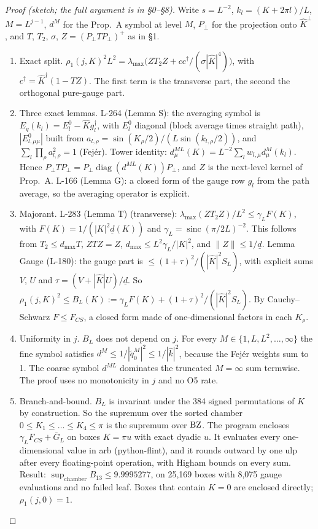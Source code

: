 \begin{proof}[Proof (sketch; the full argument is in  \S0--\S8)]
Write $s=L^{-2}$, $k_l=(K+2\pi l)/L$, $M=L^{j-1}$, $d^M$ for the Prop.\ A symbol at level $M$, $P_\perp$ for the projection onto $\hat K^\perp$, and $T$, $T_2$, $\sigma$, $Z=(P_\perp TP_\perp)^+$ as in  \S1.
\begin{enumerate}
\item Exact split. $\rho_1(j,K)^2L^2=\lambda_{\max}\bigl(ZT_2Z+cc^\dagger/(\sigma|\hat K|^4)\bigr)$, with $c^\dagger=\hat K^\dagger(1-TZ)$. The first term is the transverse part, the second the orthogonal pure-gauge part.
\item Three exact lemmas. L-264 (Lemma S): the averaging symbol is $E_q(k_l)=E^0_l-\hat Kg_l^\dagger$, with $E^0_l$ diagonal (block average times straight path), $|E^0_{l,\mu\mu}|$ built from $a_{l,\rho}=\sin(K_\rho/2)/(L\sin(k_{l,\rho}/2))$, and $\sum_l\prod_\rho a_{l,\rho}^2=1$ (Fej\'er). Tower identity: $d^{ML}_\mu(K)=L^{-2}\sum_lw_{l,\mu}d^M_\mu(k_l)$. Hence $P_\perp TP_\perp=P_\perp\operatorname{diag}(d^{ML}(K))P_\perp$, and $Z$ is the next-level kernel of Prop.\ A. L-166 (Lemma G): a closed form of the gauge row $g_l$ from the path average, so the averaging operator is explicit.
\item Majorant. L-283 (Lemma T) (transverse): $\lambda_{\max}(ZT_2Z)/L^2\le\gamma_LF(K)$, with $F(K)=1/(|K|^2\underline d(K))$ and $\gamma_L=\operatorname{sinc}(\pi/2L)^{-2}$. This follows from $T_2\le d_{\max}T$, $ZTZ=Z$, $d_{\max}\le L^2\gamma_L/|K|^2$, and $\|Z\|\le1/\underline d$. Lemma Gauge (L-180): the gauge part is $\le(1+\tau)^2/(|\hat K|^2S_L)$, with explicit sums $V$, $U$ and $\tau=(V+|\hat K|U)/\underline d$. So $\rho_1(j,K)^2\le B_L(K):=\gamma_LF(K)+(1+\tau)^2/(|\hat K|^2S_L)$. By Cauchy--Schwarz $F\le F_{CS}$, a closed form made of one-dimensional factors in each $K_\rho$.
\item Uniformity in $j$. $B_L$ does not depend on $j$. For every $M\in\{1,L,L^2,\dots,\infty\}$ the fine symbol satisfies $d^M\le1/|\tilde q^M_0|^2\le1/|\hat k|^2$, because the Fej\'er weights sum to 1. The coarse symbol $d^{ML}$ dominates the truncated $M=\infty$ sum termwise. The proof uses no monotonicity in $j$ and no O5 rate.
\item Branch-and-bound. $B_L$ is invariant under the 384 signed permutations of $K$ by construction. So the supremum over the sorted chamber $0\le K_1\le\dots\le K_4\le\pi$ is the supremum over $\mathrm{BZ}$. The program  encloses $\gamma_LF_{CS}+\bar G_L$ on boxes $K=\pi u$ with exact dyadic $u$. It evaluates every one-dimensional value in arb (python-flint), and it rounds outward by one ulp after every floating-point operation, with Higham bounds on every sum. Result: $\sup_{\text{chamber}}B_{13}\le9.9995277$, on 25{,}169 boxes with 8{,}075 gauge evaluations and no failed leaf. Boxes that contain $K=0$ are enclosed directly; $\rho_1(j,0)=1$.\qedhere
\end{enumerate}
\end{proof}
